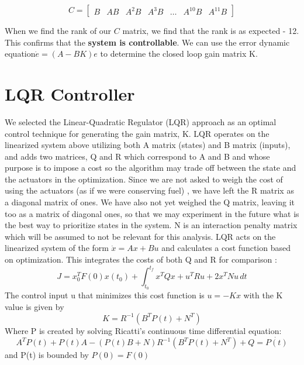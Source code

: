 \documentclass{article}
\begin{document}
\begin{multicols}{2}
\begin{equation}
C = \begin{bmatrix} B & AB & A^2B & A^3B & \dots & A^{10}B & A^{11}B\end{bmatrix}
\end{equation}

\noindent When we find the rank of our $C$ matrix, we find that the rank is as expected - 12. This confirms that the \textbf{system is controllable}. We can use the error dynamic equation$\dot{e} = (A - BK)e$  to determine the closed loop gain matrix K.

\section*{LQR Controller}
We selected the Linear-Quadratic Regulator (LQR) approach as an optimal control technique for generating the gain matrix, K.  LQR operates on the linearized system above utilizing both A matrix (states) and B matrix (inputs), and adds two matrices, Q and R which correspond to A and B and whose purpose is to impose a cost so the algorithm may trade off between the state and the actuators in the optimization.  Since we are not asked to weigh the cost of using the actuators (as if we were conserving fuel) , we have left the R matrix as a diagonal matrix of ones.  We have also not yet weighed the Q matrix, leaving it too as a matrix of diagonal ones, so that we may experiment in the future what is the best way to prioritize states in the system.  N is an interaction penalty matrix which will be assumed to not be relevant for this analysis.
\noindent
LQR acts on the linearized system of the form $\dot{x} = Ax + Bu$ and calculates a cost function based on optimization.  This integrates the costs of both Q and R for comparison :
\begin{equation}
J =x_0^TF(0)x(t_0) +  \int_{t_0}^{t_f} x^TQx+u^TRu +2x^TNu\,dt 
\end{equation}
\noindent
The control input u that minimizes this cost function is $u= -Kx$ with the K value is given by
\begin{equation}
K = R^{-1}(B^TP(t) + N^T)
\end{equation}
\noindent
Where P is created by solving Ricatti's continuous time differential equation:
\begin{equation}
A^TP(t) + P(t)A - (P(t)B + N)R^{-1}(B^TP(t) + N^T) + Q = \dot{P(t)}
\end{equation}
\noindent
and P(t) is bounded by $P(0) = F(0)$\\


\end{multicols}
\end{document}

